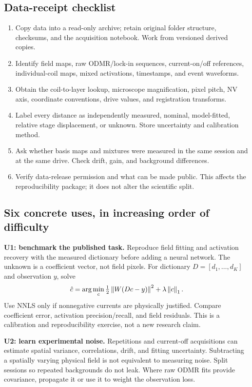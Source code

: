 \subsection{Data-receipt checklist}
\begin{enumerate}
\item Copy data into a read-only archive; retain original folder structure, checksums, and the acquisition notebook. Work from versioned derived copies.
\item Identify field maps, raw ODMR/lock-in sequences, current-on/off references, individual-coil maps, mixed activations, timestamps, and event waveforms.
\item Obtain the coil-to-layer lookup, microscope magnification, pixel pitch, NV axis, coordinate conventions, drive values, and registration transforms.
\item Label every distance as independently measured, nominal, model-fitted, relative stage displacement, or unknown. Store uncertainty and calibration method.
\item Ask whether basis maps and mixtures were measured in the same session and at the same drive. Check drift, gain, and background differences.
\item Verify data-release permission and what can be made public. This affects the reproducibility package; it does not alter the scientific split.
\end{enumerate}

\subsection{Six concrete uses, in increasing order of difficulty}
\textbf{U1: benchmark the published task.} Reproduce field fitting and activation recovery with the measured dictionary before adding a neural network. The unknown is a coefficient vector, not field pixels. For dictionary $D=[d_1,\ldots,d_K]$ and observation $y$, solve
\begin{equation}
 \hat c=\arg\min_c \tfrac12\left\lVert W(Dc-y)\right\rVert^2+\lambda\left\lVert c\right\rVert_1.
\end{equation}
Use NNLS only if nonnegative currents are physically justified. Compare coefficient error, activation precision/recall, and field residuals. This is a calibration and reproducibility exercise, not a new research claim.

\textbf{U2: learn experimental noise.} Repetitions and current-off acquisitions can estimate spatial variance, correlations, drift, and fitting uncertainty. Subtracting a spatially varying physical field is not equivalent to measuring noise. Split sessions so repeated backgrounds do not leak. Where raw ODMR fits provide covariance, propagate it or use it to weight the observation loss.

